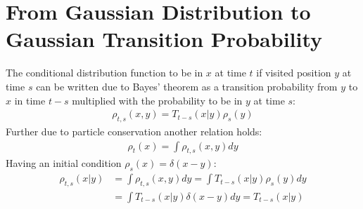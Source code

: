 \documentclass[
  a4paper,BCOR10mm,oneside,
  headsepline,footsepline,%
  fleqn,openbib
]{scrbook}
\begin{document}
\section{From Gaussian Distribution to Gaussian Transition Probability}\label{baystheorem}
The conditional distribution function to be in $x$ at time $t$ if visited position $y$ at time $s$   can be written due to Bayes' theorem as a transition probability from $y$ to $x$ in time $t-s$ multiplied with the probability to be in $y$ at time $s$:
\begin{align}
 \rho_{t,s}(x,y)=T_{t-s}(x|y) \rho_s(y)
\end{align}
Further due to particle conservation another relation holds:
\begin{align}
 \rho_{t}(x)= \int \rho_{t,s}(x,y) dy
\end{align}
Having an initial condition $\rho_{s}(x)= \delta(x-y)$:
\begin{align}
 \rho_{t,s}(x|y)&= \int \rho_{t,s}(x,y) dy = \int T_{t-s}(x|y) \rho_s(y) dy\\
 &= \int T_{t-s}(x|y) \delta(x-y) dy 
 = T_{t-s}(x|y)
\end{align}
\end{document}
